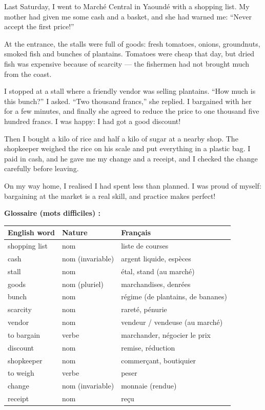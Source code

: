 \documentclass[11pt]{article}
\begin{document}
\begin{textebox}
Last Saturday, I went to Marché Central in Yaoundé with a shopping list. My mother had given me some cash and a basket, and she had warned me: “Never accept the first price!”

At the entrance, the stalls were full of goods: fresh tomatoes, onions, groundnuts, smoked fish and bunches of plantains. Tomatoes were cheap that day, but dried fish was expensive because of scarcity — the fishermen had not brought much from the coast.

I stopped at a stall where a friendly vendor was selling plantains. “How much is this bunch?” I asked. “Two thousand francs,” she replied. I bargained with her for a few minutes, and finally she agreed to reduce the price to one thousand five hundred francs. I was happy: I had got a good discount!

Then I bought a kilo of rice and half a kilo of sugar at a nearby shop. The shopkeeper weighed the rice on his scale and put everything in a plastic bag. I paid in cash, and he gave me my change and a receipt, and I checked the change carefully before leaving.

On my way home, I realised I had spent less than planned. I was proud of myself: bargaining at the market is a real skill, and practice makes perfect!
\end{textebox}

\textbf{Glossaire (mots difficiles) :}

\begin{center}
\begin{tabularx}{\linewidth}{|l|l|X|}
\hline
\rowcolor{popblueL} English word & Nature & Français \\
\hline
shopping list & nom & liste de courses \\
\hline
cash & nom (invariable) & argent liquide, espèces \\
\hline
stall & nom & étal, stand (au marché) \\
\hline
goods & nom (pluriel) & marchandises, denrées \\
\hline
bunch & nom & régime (de plantains, de bananes) \\
\hline
scarcity & nom & rareté, pénurie \\
\hline
vendor & nom & vendeur / vendeuse (au marché) \\
\hline
to bargain & verbe & marchander, négocier le prix \\
\hline
discount & nom & remise, réduction \\
\hline
shopkeeper & nom & commerçant, boutiquier \\
\hline
to weigh & verbe & peser \\
\hline
change & nom (invariable) & monnaie (rendue) \\
\hline
receipt & nom & reçu \\
\hline
\end{tabularx}
\end{center}
\end{document}
